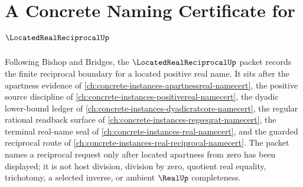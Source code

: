 \chapter{A Concrete Naming Certificate for $\LocatedRealReciprocalUp$}
\label{ch:concrete-instances-located-real-reciprocal-namecert}

Following Bishop and Bridges, the $\LocatedRealReciprocalUp$ packet records the finite reciprocal boundary for a located positive real name. It sits after the apartness evidence of \autoref{ch:concrete-instances-apartnessreal-namecert}, the positive source discipline of \autoref{ch:concrete-instances-positivereal-namecert}, the dyadic lower-bound ledger of \autoref{ch:concrete-instances-dyadicratcore-namecert}, the regular rational readback surface of \autoref{ch:concrete-instances-regseqrat-namecert}, the terminal real-name seal of \autoref{ch:concrete-instances-real-namecert}, and the guarded reciprocal route of \autoref{ch:concrete-instances-real-reciprocal-namecert}. The packet names a reciprocal request only after located apartness from zero has been displayed; it is not host division, division by zero, quotient real equality, trichotomy, a selected inverse, or ambient $\RealUp$ completeness.

